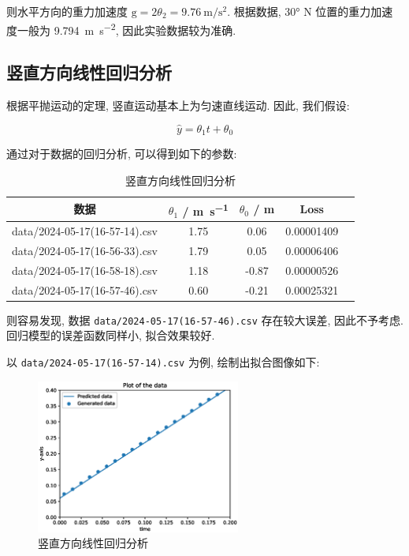 \documentclass{article}
\begin{document}
则水平方向的重力加速度 $\mathrm g=2\theta_2 = \SI{9.76}{\meter\per\second\squared}$. 根据数据, \ang{30} N 位置的重力加速度一般为 \SI{9.794}{\meter\per\second\squared}, 因此实验数据较为准确.

\subsection{竖直方向线性回归分析}

根据平抛运动的定理, 竖直运动基本上为匀速直线运动. 因此, 我们假设:

\begin{equation}
    \hat{y} = \theta_1 t + \theta_0
\end{equation}

通过对于数据的回归分析, 可以得到如下的参数:

\begin{table}[H]
    \small
    \centering
    \begin{tabular}{ccccc}
        \hline
        \textbf{数据} & $\theta_1$ / \si{\meter\per\second} & $\theta_0$ / \si{\meter} & \textbf{Loss} \\
        \hline
        data/2024-05-17(16-57-14).csv & 1.75 & 0.06 & 0.00001409 \\
        data/2024-05-17(16-56-33).csv & 1.79 & 0.05 & 0.00006406 \\
        data/2024-05-17(16-58-18).csv & 1.18 & -0.87 & 0.00000526 \\
        data/2024-05-17(16-57-46).csv & 0.60 & -0.21 & 0.00025321 \\
        \hline
    \end{tabular}
    \caption{竖直方向线性回归分析}
    \label{tab:linear-regression-y}
\end{table}

则容易发现, 数据 \texttt{data/2024-05-17(16-57-46).csv} 存在较大误差, 因此不予考虑. 回归模型的误差函数同样小, 拟合效果较好.

以 \texttt{data/2024-05-17(16-57-14).csv} 为例, 绘制出拟合图像如下:

\begin{figure}[H]
    \centering
    \includegraphics[width=0.6\textwidth]{figures/plot-y-regression.eps}
    \caption{竖直方向线性回归分析}
    \label{fig:linear-regression-y}
\end{figure}
\end{document}
